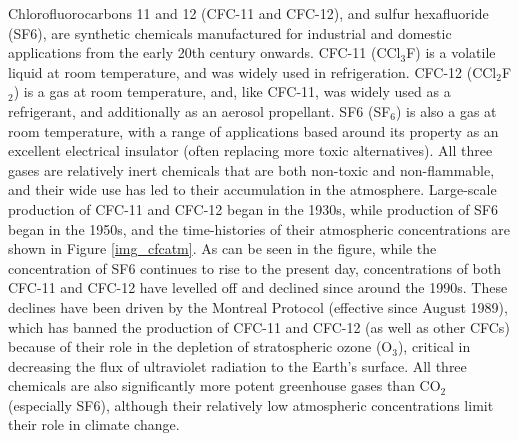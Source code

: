\documentclass[../main/TOP_manual]{subfiles}
\begin{document}
Chlorofluorocarbons 11 and 12 (CFC-11 and CFC-12), and sulfur hexafluoride (SF6), are synthetic chemicals manufactured for industrial and domestic applications from the early 20th century onwards.
CFC-11 (CCl$_{3}$F) is a volatile liquid at room temperature, and was widely used in refrigeration.
CFC-12 (CCl$_{2}$F$_{2}$) is a gas at room temperature, and, like CFC-11, was widely used as a refrigerant,
and additionally as an aerosol propellant.
SF6 (SF$_{6}$) is also a gas at room temperature, with a range of applications based around its property as an excellent electrical insulator (often replacing more toxic alternatives).
All three gases are relatively inert chemicals that are both non-toxic and non-flammable, and their wide use has led to their accumulation in the atmosphere.
Large-scale production of CFC-11 and CFC-12 began in the 1930s, while production of SF6 began in the 1950s, and the time-histories of their atmospheric concentrations are shown in Figure \autoref{img_cfcatm}.
As can be seen in the figure, while the concentration of SF6 continues to rise to the present day, concentrations of both CFC-11 and CFC-12 have levelled off and declined since around the 1990s.
These declines have been driven by the Montreal Protocol (effective since August 1989), which has banned the production of CFC-11 and CFC-12 (as well as other CFCs) because of their role in the depletion of
stratospheric ozone (O$_{3}$), critical in decreasing the flux of ultraviolet radiation to the Earth's surface. All three chemicals are also  significantly more potent greenhouse gases
than CO$_{2}$ (especially SF6), although their relatively low atmospheric concentrations limit their role in climate change. \\

\end{document}
